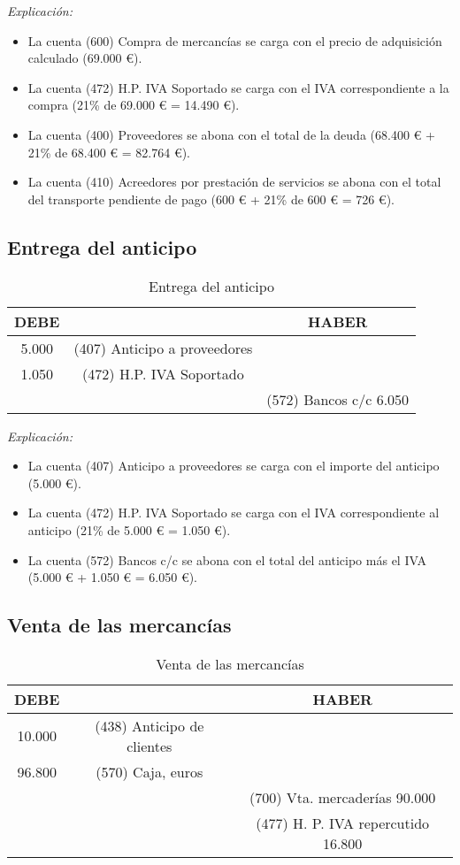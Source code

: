\documentclass{article}
\begin{document}
\textit{Explicación:} 
\begin{itemize}
    \item La cuenta (600) Compra de mercancías se carga con el precio de adquisición calculado (69.000 €).
    \item La cuenta (472) H.P. IVA Soportado se carga con el IVA correspondiente a la compra (21\% de 69.000 € = 14.490 €).
    \item La cuenta (400) Proveedores se abona con el total de la deuda (68.400 € + 21\% de 68.400 € = 82.764 €).
    \item La cuenta (410) Acreedores por prestación de servicios se abona con el total del transporte pendiente de pago (600 € + 21\% de 600 € = 726 €).
\end{itemize}

\subsection*{Entrega del anticipo}

\begin{table}[H]
\centering
\begin{tabular}{|c|c|c|}
\hline
\textbf{DEBE} & & \textbf{HABER} \\
\hline
5.000 & (407) Anticipo a proveedores & \\
1.050 & (472) H.P. IVA Soportado & \\
 & & (572) Bancos c/c 6.050 \\
\hline
\end{tabular}
\caption{Entrega del anticipo}
\end{table}

\textit{Explicación:} 
\begin{itemize}
    \item La cuenta (407) Anticipo a proveedores se carga con el importe del anticipo (5.000 €).
    \item La cuenta (472) H.P. IVA Soportado se carga con el IVA correspondiente al anticipo (21\% de 5.000 € = 1.050 €).
    \item La cuenta (572) Bancos c/c se abona con el total del anticipo más el IVA (5.000 € + 1.050 € = 6.050 €).
\end{itemize}

\subsection*{Venta de las mercancías}

\begin{table}[H]
\centering
\begin{tabular}{|c|c|c|}
\hline
\textbf{DEBE} & & \textbf{HABER} \\
\hline
10.000 & (438) Anticipo de clientes & \\
96.800 & (570) Caja, euros & \\
 & & (700) Vta. mercaderías 90.000 \\
 & & (477) H. P. IVA repercutido 16.800 \\
\hline
\end{tabular}
\caption{Venta de las mercancías}
\end{table}
\end{document}
